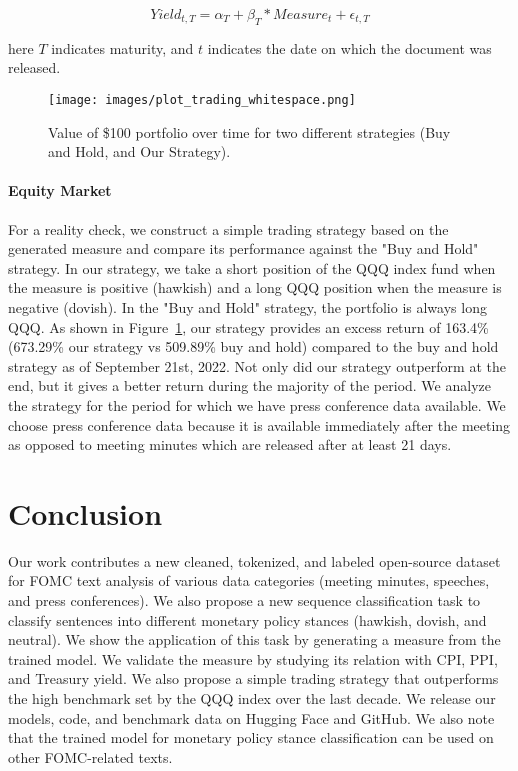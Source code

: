 \documentclass[11pt]{article}
\begin{document}
\begin{equation}
    Yield_{t,T} = \alpha_{T} + \beta_{T} * Measure_{t} + \epsilon_{t,T}      
    \label{eq:treasury_reg}
\end{equation}

here $T$ indicates maturity, and $t$ indicates the date on which the document was released. 




\begin{figure}[ht]
    \centering
    \texttt{[image: images/plot\_trading\_whitespace.png]}
    \caption{Value of \$100 portfolio over time for two different strategies (Buy and Hold, and Our Strategy).}
    \label{fig:trading_qqq}
\end{figure}



\paragraph{Equity Market} For a reality check, we construct a simple trading strategy based on the generated measure and compare its performance against the "Buy and Hold" strategy. In our strategy, we take a short position of the QQQ index fund when the measure is positive (hawkish) and a long QQQ position when the measure is negative (dovish). In the "Buy and Hold" strategy, the portfolio is always long QQQ. As shown in Figure~\ref{fig:trading_qqq}, our strategy provides an excess return of 163.4\% (673.29\% our strategy vs 509.89\% buy and hold) compared to the buy and hold strategy as of September 21st, 2022. Not only did our strategy outperform at the end, but it gives a better return during the majority of the period. We analyze the strategy for the period for which we have press conference data available. We choose press conference data because it is available immediately after the meeting as opposed to meeting minutes which are released after at least 21 days. 

\section{Conclusion}
Our work contributes a new cleaned, tokenized, and labeled open-source dataset for FOMC text analysis of various data categories (meeting minutes, speeches, and press conferences). We also propose a new sequence classification task to classify sentences into different monetary policy stances (hawkish, dovish, and neutral). We show the application of this task by generating a measure from the trained model. We validate the measure by studying its relation with CPI, PPI, and Treasury yield. We also propose a simple trading strategy that outperforms the high benchmark set by the QQQ index over the last decade. We release our models, code, and benchmark
data on Hugging Face and GitHub. We also note that the trained model for monetary policy stance classification can be used on other FOMC-related texts. 
\end{document}
